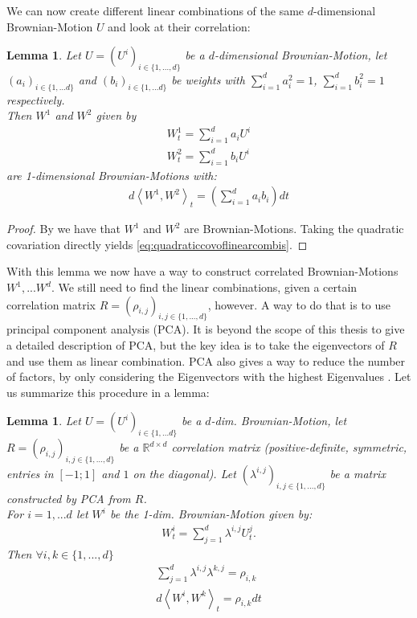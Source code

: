 \documentclass[12pt]{article}
\newtheorem{lemma}[theorem]{Lemma}
\begin{document}
	We can now create different linear combinations of the same $d$-dimensional Brownian-Motion $U$ and look at their correlation:
	\begin{lemma}
		Let $U = (U^i)_{i\in\{1, ..., d\}}$ be a $d$-dimensional Brownian-Motion, let $(a_i)_{i\in\{1,...d\}}$ and $(b_i)_{i\in\{1,...d\}}$ be weights with $\sum_{i=1}^{d}a^2_i = 1$, $\sum_{i=1}^{d}b^2_i = 1$ respectively.\\
		Then $W^1$ and $W^2$ given by 
		\begin{align*}
			W^1_t = \sum_{i=1}^{d}a_iU^i\\
			W^2_t = \sum_{i=1}^{d}b_iU^i
		\end{align*}
		are 1-dimensional Brownian-Motions with:
		\begin{align}\label{eq:quadraticcovoflinearcombis}
			d\left\langle W^{1}, W^{2} \right\rangle_t = \left(\sum_{i=1}^{d}a_ib_i \right)dt
		\end{align}
	\end{lemma}
	\begin{proof}
		By  we have that $W^1$ and $W^2$ are Brownian-Motions. Taking the quadratic covariation directly yields \cref{eq:quadraticcovoflinearcombis}.
	\end{proof}
	With this lemma we now have a way to construct correlated Brownian-Motions $W^1, ... W^d$. We still need to find the linear combinations, given a certain correlation matrix $R = (\rho_{i,j})_{i,j\in\{1,...,d\}}$, however. A way to do that is to use principal component analysis (PCA). It is beyond the scope of this thesis to give a detailed description of PCA, but the key idea is to take the eigenvectors of $R$ and use them as linear combination. PCA also gives a way to reduce the number of factors, by only considering the Eigenvectors with the highest Eigenvalues \cite{FriesBook}. Let us summarize this procedure in a lemma:
	\begin{lemma}
		Let $U=(U^i)_{i\in\{1, ... d\}}$ be a $d$-dim. Brownian-Motion, let $R=(\rho_{i,j})_{i,j\in\{1,...,d\}}$ be a $\mathbb{R}^{d\times d}$ correlation matrix (positive-definite, symmetric, entries in $\left[-1;1\right]$ and $1$ on the diagonal). Let $(\lambda^{i,j})_{i,j\in\{1,...,d\}}$ be a matrix constructed by PCA from $R$.\\
		For $i=1,...d$ let $W^i$ be the 1-dim. Brownian-Motion given by:
		\begin{align*}
			W^i_t = \sum_{j=1}^{d}\lambda^{i,j}U^j_t.
		\end{align*}
		Then $\forall i, k \in \{1, ..., d\}$ 
		\begin{align*}
			\sum_{j=1}^{d}\lambda^{i,j}\lambda^{k,j} = \rho_{i,k}\\
			d\left\langle W^{i}, W^{k} \right\rangle_t = \rho_{i,k}dt
		\end{align*}
	\end{lemma}
\end{document}
